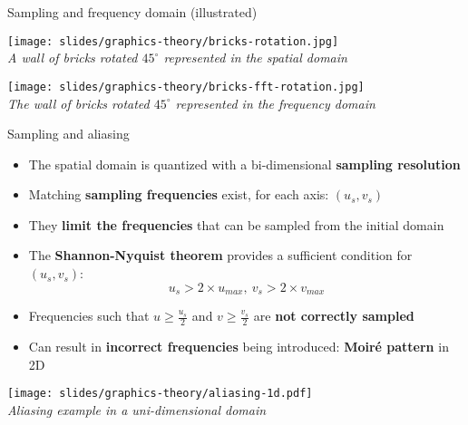 \begin{frame}{Sampling and frequency domain (illustrated)}
  \begin{minipage}[b]{0.45\textwidth}
    \centering
    \texttt{[image: slides/graphics-theory/bricks-rotation.jpg]}\\
    \textit{\small A wall of bricks rotated \(45^{\circ}\) represented in the spatial domain}
  \end{minipage}
  \hfill
  \begin{minipage}[b]{0.45\textwidth}
    \centering
    \texttt{[image: slides/graphics-theory/bricks-fft-rotation.jpg]}\\
    \textit{\small The wall of bricks rotated \(45^{\circ}\) represented in the frequency domain}
  \end{minipage}
\end{frame}

\begin{frame}{Sampling and aliasing}
  \begin{itemize}
  \item The spatial domain is quantized with a bi-dimensional \textbf{sampling resolution}
  \item Matching \textbf{sampling frequencies} exist, for each axis: \((u_s,v_s)\)
  \item They \textbf{limit the frequencies} that can be sampled from the initial domain
  \item The \textbf{Shannon-Nyquist theorem} provides a sufficient condition for \((u_s,v_s)\):
\[
u_s > 2 \times u_{max}, ~v_s > 2 \times v_{max}
\]
  \item Frequencies such that \(u \geq \frac{u_s}{2}\) and \(v \geq \frac{v_s}{2}\) are \textbf{not correctly sampled}
  \item Can result in \textbf{incorrect frequencies} being introduced: \textbf{Moiré pattern} in 2D
  \end{itemize}

  \begin{center}
  \texttt{[image: slides/graphics-theory/aliasing-1d.pdf]}\\
  \textit{\small Aliasing example in a uni-dimensional domain}
  \end{center}
\end{frame}


